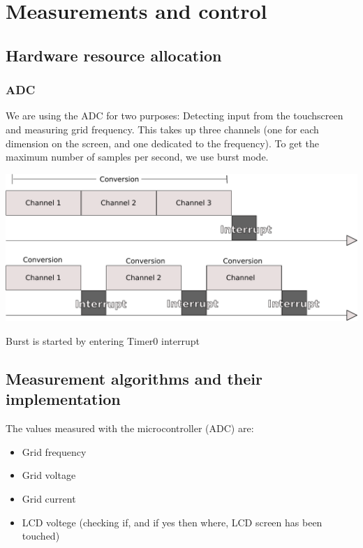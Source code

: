 \section{Measurements and control}
\subsection{Hardware resource allocation}
\subsubsection{ADC}
We are using the ADC for two purposes: Detecting input from the touchscreen and measuring grid frequency. This takes up three channels (one for each dimension on the screen, and one dedicated to the frequency). To get the maximum number of samples per second, we use burst mode. \\
\begin{center}
\includegraphics[scale=0.5]{figs/burst_mode.pdf}
\end{center}
Burst is started by entering Timer0 interrupt





\subsection{Measurement algorithms and their implementation}
The values measured with the microcontroller (ADC) are:
\begin{itemize}
\item Grid frequency
\item Grid voltage
\item Grid current
\item LCD voltege (checking if, and if yes then where, LCD screen has been touched)
\end{itemize}

